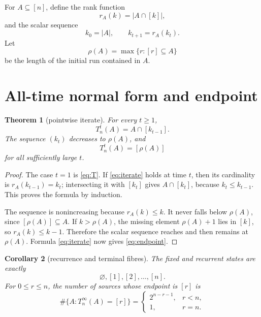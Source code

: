 \documentclass[a4paper,11pt]{amsart}
\newtheorem{theorem}{Theorem}[section]
\newtheorem{corollary}[theorem]{Corollary}
\theoremstyle{remark}
\begin{document}
For $A\subseteq[n]$, define the rank function
\begin{equation}\label{eq:rank}
 r_A(k)=|A\cap[k]|,
\end{equation}
and the scalar sequence
\begin{equation}\label{eq:k}
 k_0=|A|,\qquad k_{t+1}=r_A(k_t).
\end{equation}
Let
\begin{equation}\label{eq:rho}
 \rho(A)=\max\{r:[r]\subseteq A\}
\end{equation}
be the length of the initial run contained in $A$.

\section{All-time normal form and endpoint}

\begin{theorem}[pointwise iterate]\label{thm:iterate}
For every $t\geq1$,
\begin{equation}\label{eq:iterate}
 T_n^t(A)=A\cap[k_{t-1}].
\end{equation}
The sequence $(k_t)$ decreases to $\rho(A)$, and
\begin{equation}\label{eq:endpoint}
 T_n^t(A)=[\rho(A)]
\end{equation}
for all sufficiently large $t$.
\end{theorem}

\begin{proof}
The case $t=1$ is \eqref{eq:T}.  If \eqref{eq:iterate} holds at time $t$,
then its cardinality is $r_A(k_{t-1})=k_t$; intersecting it with $[k_t]$
gives $A\cap[k_t]$, because $k_t\leq k_{t-1}$.  This proves the formula by
induction.

The sequence is nonincreasing because $r_A(k)\leq k$.  It never falls below
$\rho(A)$, since $[\rho(A)]\subseteq A$.  If $k>\rho(A)$, the missing element
$\rho(A)+1$ lies in $[k]$, so $r_A(k)\leq k-1$.  Therefore the scalar
sequence reaches and then remains at $\rho(A)$.  Formula
\eqref{eq:iterate} now gives \eqref{eq:endpoint}.
\end{proof}

\begin{corollary}[recurrence and terminal fibres]\label{cor:terminal}
The fixed and recurrent states are exactly
\begin{equation}\label{eq:fixed}
 \varnothing,[1],[2],\ldots,[n].
\end{equation}
For $0\leq r\leq n$, the number of sources whose endpoint is $[r]$ is
\begin{equation}\label{eq:basin}
 \#\{A:T_n^\infty(A)=[r]\}=
 \begin{cases}
 2^{n-r-1},&r<n,\\
 1,&r=n.
 \end{cases}
\end{equation}
\end{corollary}
\end{document}
